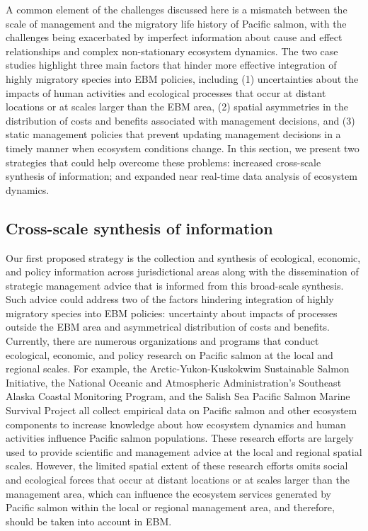 A common element of the challenges discussed here is a mismatch between the
scale of management and the migratory life history of Pacific salmon, with the
challenges being exacerbated by imperfect information about cause and effect
relationships and complex non-stationary ecosystem dynamics. The two case
studies highlight three main factors that hinder more effective integration of
highly migratory species into EBM policies, including (1) uncertainties about
the impacts of human activities and ecological processes that occur at distant
locations or at scales larger than the EBM area, (2) spatial asymmetries in the
distribution of costs and benefits associated with management decisions, and (3)
static management policies that prevent updating management decisions in a
timely manner when ecosystem conditions change. In this section, we present two
strategies that could help overcome these problems: increased cross-scale
synthesis of information; and expanded near real-time data analysis of ecosystem
dynamics.


\subsection{Cross-scale synthesis of information}

Our first proposed strategy is the collection and synthesis of ecological,
economic, and policy information across jurisdictional areas along with the
dissemination of strategic management advice that is informed from this
broad-scale synthesis. Such advice could address two of the factors hindering
integration of highly migratory species into EBM policies: uncertainty about
impacts of processes outside the EBM area and asymmetrical distribution of
costs and benefits. Currently, there are numerous organizations and programs
that conduct ecological, economic, and policy research on Pacific salmon at the
local and regional scales. For example, the Arctic-Yukon-Kuskokwim Sustainable
Salmon Initiative, the National Oceanic and Atmospheric Administration's
Southeast Alaska Coastal Monitoring Program, and the Salish Sea Pacific Salmon
Marine Survival Project all collect empirical data on Pacific salmon and other
ecosystem components to increase knowledge about how ecosystem dynamics and
human activities influence Pacific salmon populations. These research efforts
are largely used to provide scientific and management advice at the local and
regional spatial scales. However, the limited spatial extent of these research
efforts omits social and ecological forces that occur at distant locations or at
scales larger than the management area, which can influence the ecosystem
services generated by Pacific salmon within the local or regional management
area, and therefore, should be taken into account in EBM.

